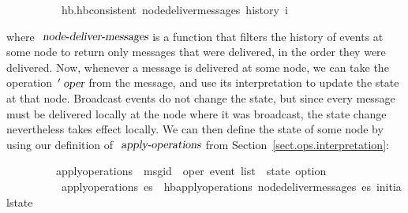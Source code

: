 \vspace{0.25em}
\begin{isabellebody}
\ \ \ \ \ \ \ \ \ \ {\isachardoublequoteopen}hb.hb{\isacharunderscore}consistent\ {\isacharparenleft}node{\isacharunderscore}deliver{\isacharunderscore}messages\ {\isacharparenleft}history\ i{\isacharparenright}{\isacharparenright}{\isachardoublequoteclose}
\end{isabellebody}
\vspace{0.25em}
\noindent
where $\isa{node-deliver-messages}$ is a function that filters the history of events at some node to return only messages that were delivered, in the order they were delivered.
Now, whenever a message is delivered at some node, we can take the operation $\isacharprime\isa{oper}$ from the message, and use its interpretation to update the state at that node.
Broadcast events do not change the state, but since every message must be delivered locally at the node where it was broadcast, the state change nevertheless takes effect locally.
We can then define the state of some node by using our definition of $\isa{apply-operations}$ from Section~\ref{sect.ops.interpretation}:
\vspace{0.25em}
\begin{isabellebody}
\ \ \ \ \ \ \ \ \ apply{\isacharunderscore}operations\ {\isacharcolon}{\isacharcolon}\ {\isachardoublequoteopen}{\isacharparenleft}{\isacharprime}msgid\ {\isasymtimes}\ {\isacharprime}oper{\isacharparenright}\ event\ list\ {\isasymRightarrow}\ {\isacharprime}state\ option{\isachardoublequoteclose}\ \isanewline
\ \ \ \ \ \ \ \ \ \ {\isachardoublequoteopen}apply{\isacharunderscore}operations\ es\ {\isasymequiv}\ hb{\isachardot}apply{\isacharunderscore}operations\ {\isacharparenleft}node{\isacharunderscore}deliver{\isacharunderscore}messages\ es{\isacharparenright}\ initial{\isacharunderscore}state{\isachardoublequoteclose}
\end{isabellebody}
\vspace{0.25em}

